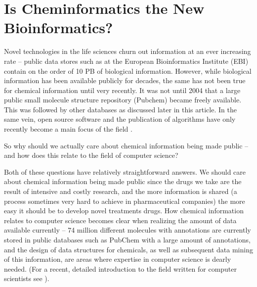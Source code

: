 \documentclass{sig-alternate}
\begin{document}

\section{Is Cheminformatics the New Bioinformatics?}

Novel technologies in the life sciences churn out information at an ever
increasing rate -- public data stores such as at the European Bioinformatics
Institute (EBI) contain on the order of 10 PB of biological information.
However, while biological information has been available publicly for decades,
the same has not been true for chemical information until very recently. It was
not until 2004 that a large public small molecule structure repository (Pubchem)
became freely available. This was followed by other databases as discussed later
in this article. In the same vein, open source software and the publication of
algorithms have only recently become a main focus of the field
\cite{faulon2010}.

So why should we actually care about chemical information being made public --
and how does this relate to the field of computer science?

Both of these questions have relatively straightforward answers. We should care
about chemical information being made public since the drugs we take are the
result of intensive and costly research, and the more information is shared (a
process sometimes very hard to achieve in pharmaceutical companies) the more
easy it should be to develop novel treatments drugs. How chemical information
relates to computer science becomes clear when realizing the amount of data
available currently -- 74 million different molecules with annotations are
currently stored in public databases such as PubChem with a large amount of
annotations, and the design of data structures for chemicals, as well as
subsequent data mining of this information, are areas where expertise in
computer science is dearly needed. (For a recent, detailed introduction to the
field written for computer scientists see \cite{brown2009}). 
\end{document}
